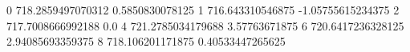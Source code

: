 0 718.2859497070312 0.5850830078125
1 716.643310546875 -1.05755615234375
2 717.7008666992188 0.0
4 721.2785034179688 3.57763671875
6 720.6417236328125 2.94085693359375
8 718.106201171875 0.40533447265625
